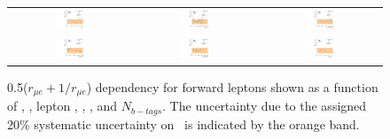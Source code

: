 \begin{figure}[htbp]
  \begin{center}
    \begin{tabular}{ccc}
      \includegraphics[width=0.25\textwidth]{bkgd/figs/rSFOFFromRMuE_ZPeakControlForward_Run2015_25ns_NJets_None.pdf} &
      \includegraphics[width=0.25\textwidth]{bkgd/figs/rSFOFFromRMuE_ZPeakControlForward_Run2015_25ns_nVtx_None.pdf}  &
      \includegraphics[width=0.25\textwidth]{bkgd/figs/rSFOFFromRMuE_ZPeakControlForward_Run2015_25ns_TrailingPt_None.pdf} \\
      \includegraphics[width=0.25\textwidth]{bkgd/figs/rSFOFFromRMuE_ZPeakControlForward_Run2015_25ns_Mll_None.pdf} &
      \includegraphics[width=0.25\textwidth]{bkgd/figs/rSFOFFromRMuE_ZPeakControlForward_Run2015_25ns_MET_None.pdf} &
      \includegraphics[width=0.25\textwidth]{bkgd/figs/rSFOFFromRMuE_ZPeakControlForward_Run2015_25ns_NBJets_None.pdf} \\
    \end{tabular}
  \end{center}
  \caption{
    \label{fig:RDependencyForward}
    0.5($r_{\mu e}+1/r_{\mu e}$) dependency for forward leptons shown as a function of \nj, \nvtx, lepton \pt, \mll, \MET, and $N_{b-tags}$.
    The uncertainty due to the assigned 20\% systematic uncertainty on \rmue~is indicated by the orange band.
  }
\end{figure}

